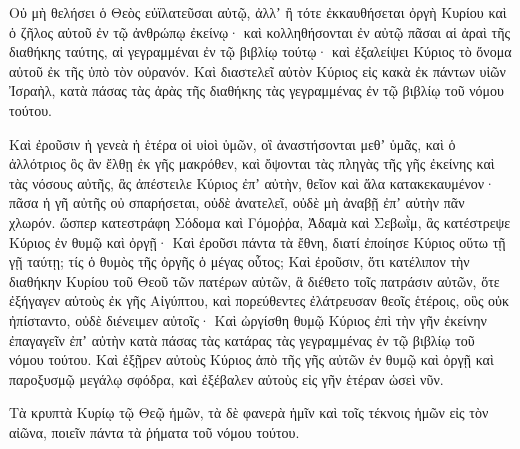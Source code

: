 {Οὐ μὴ θελήσει ὁ Θεὸς εὐϊλατεῦσαι αὐτῷ, ἀλλʼ ἢ τότε ἐκκαυθήσεται ὀργὴ Κυρίου καὶ ὁ ζῆλος αὐτοῦ ἐν τῷ ἀνθρώπῳ ἐκείνῳ· καὶ κολληθήσονται ἐν αὐτῷ πᾶσαι αἱ ἀραὶ τῆς διαθήκης ταύτης, αἱ γεγραμμέναι ἐν τῷ βιβλίῳ τούτῳ· καὶ ἐξαλείψει Κύριος τὸ ὄνομα αὐτοῦ ἐκ τῆς ὑπὸ τὸν οὐρανόν.
Καὶ διαστελεῖ αὐτὸν Κύριος εἰς κακὰ ἐκ πάντων υἱῶν Ἰσραὴλ, κατὰ πάσας τὰς ἀρὰς τῆς διαθήκης τὰς γεγραμμένας ἐν τῷ βιβλίῳ τοῦ νόμου τούτου.
\par }{\PP {}Καὶ ἐροῦσιν ἡ γενεὰ ἡ ἑτέρα οἱ υἱοὶ ὑμῶν, οἳ ἀναστήσονται μεθʼ ὑμᾶς, καὶ ὁ ἀλλότριος ὃς ἂν ἔλθῃ ἐκ γῆς μακρόθεν, καὶ ὄψονται τὰς πληγὰς τῆς γῆς ἐκείνης καὶ τὰς νόσους αὐτῆς, ἃς ἀπέστειλε Κύριος ἐπʼ αὐτὴν,
θεῖον καὶ ἅλα κατακεκαυμένον· πᾶσα ἡ γῆ αὐτῆς οὐ σπαρήσεται, οὐδὲ ἀνατελεῖ, οὐδὲ μὴ ἀναβῇ ἐπʼ αὐτὴν πᾶν χλωρόν. ὥσπερ κατεστράφη Σόδομα καὶ Γόμοῤῥα, Ἀδαμὰ καὶ Σεβωῒμ, ἃς κατέστρεψε Κύριος ἐν θυμῷ καὶ ὀργῇ·
Καὶ ἐροῦσι πάντα τὰ ἔθνη, διατί ἐποίησε Κύριος οὕτω τῇ γῇ ταύτῃ; τίς ὁ θυμὸς τῆς ὀργῆς ὁ μέγας οὗτος;
Καὶ ἐροῦσιν, ὅτι κατέλιπον τὴν διαθήκην Κυρίου τοῦ Θεοῦ τῶν πατέρων αὐτῶν, ἃ διέθετο τοῖς πατράσιν αὐτῶν, ὅτε ἐξήγαγεν αὐτοὺς ἐκ γῆς Αἰγύπτου,
καὶ πορεύθεντες ἐλάτρευσαν θεοῖς ἑτέροις, οὓς οὐκ ἠπίσταντο, οὐδὲ διένειμεν αὐτοῖς·
Καὶ ὠργίσθη θυμῷ Κύριος ἐπὶ τὴν γῆν ἐκείνην ἐπαγαγεῖν ἐπʼ αὐτὴν κατὰ πάσας τὰς κατάρας τὰς γεγραμμένας ἐν τῷ βιβλίῳ τοῦ νόμου τούτου.
Καὶ ἐξῇρεν αὐτοὺς Κύριος ἀπὸ τῆς γῆς αὐτῶν ἐν θυμῷ καὶ ὀργῇ καὶ παροξυσμῷ μεγάλῳ σφόδρα, καὶ ἐξέβαλεν αὐτοὺς εἰς γῆν ἑτέραν ὡσεὶ νῦν.
\par }{\PP {}Τὰ κρυπτὰ Κυρίῳ τῷ Θεῷ ἡμῶν, τὰ δὲ φανερὰ ἡμῖν καὶ τοῖς τέκνοις ἡμῶν εἰς τὸν αἰῶνα, ποιεῖν πάντα τὰ ῥήματα τοῦ νόμου τούτου.

}
